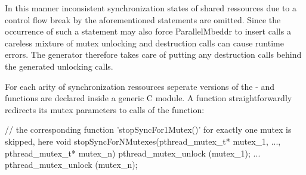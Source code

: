 In this manner inconsistent synchronization states of shared ressources due to a control flow break by the aforementioned statements are omitted. Since the occurrence of such a statement may also force ParallelMbeddr to insert  calls a careless mixture of mutex unlocking and destruction calls can cause runtime errors\cite{Mutexes}. The generator therefore takes care of putting any destruction calls behind the generated unlocking calls.

For each arity of synchronization ressources seperate versions of the - and  functions are declared inside a generic C module. A  function straightforwardly redirects its mutex parameters to calls of the  function:
\begin{ccode}
// the corresponding function 'stopSyncFor1Mutex()' for exactly one mutex is skipped, here
void stopSyncForNMutexes(pthread_mutex_t* mutex_1, ..., pthread_mutex_t* mutex_n) { 
  pthread_mutex_unlock (mutex_1);
  ...
  pthread_mutex_unlock (mutex_n); 
}
\end{ccode}

